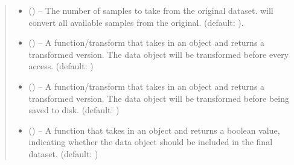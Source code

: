 \documentclass[letterpaper,10pt,english]{sphinxhowto}
\begin{document}
\begin{fulllineitems}
\begin{quote}
\begin{description}
\begin{itemize}
\item {} 
\sphinxAtStartPar
{} () – The number of samples to take from the original dataset.  will convert all available samples from the original. (default: ).

\item {} 
\sphinxAtStartPar
{} (\sphinxstyleliteralemphasis{\sphinxupquote{, }}) – A function/transform that takes in an  object and returns a transformed version. The data object will be transformed before every access. (default: )

\item {} 
\sphinxAtStartPar
{} (\sphinxstyleliteralemphasis{\sphinxupquote{, }}) – A function/transform that takes in an  object and returns a transformed version. The data object will be transformed before being saved to disk. (default: )

\item {} 
\sphinxAtStartPar
{} (\sphinxstyleliteralemphasis{\sphinxupquote{, }}) – A function that takes in an  object and returns a boolean value, indicating whether the data object should be included in the final dataset. (default: )

\end{itemize}

\end{description}\end{quote}


\end{fulllineitems}
\end{document}
